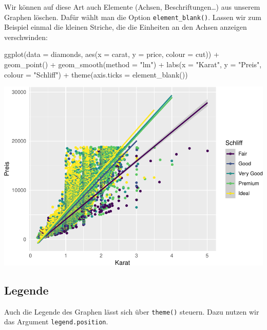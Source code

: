 \documentclass[
]{book}
\newenvironment{Shaded}{\begin{snugshade}}{\end{snugshade}}
\newcommand{\AttributeTok}[1]{\textcolor[rgb]{0.77,0.63,0.00}{#1}}
\newcommand{\FunctionTok}[1]{\textcolor[rgb]{0.00,0.00,0.00}{#1}}
\newcommand{\NormalTok}[1]{#1}
\newcommand{\SpecialCharTok}[1]{\textcolor[rgb]{0.00,0.00,0.00}{#1}}
\newcommand{\StringTok}[1]{\textcolor[rgb]{0.31,0.60,0.02}{#1}}
\begin{document}
Wir können auf diese Art auch Elemente (Achsen, Beschriftungen\ldots) aus unserem Graphen löschen. Dafür wählt man die Option \texttt{element\_blank()}. Lassen wir zum Beispiel einmal die kleinen Striche, die die Einheiten an den Achsen anzeigen verschwinden:

\begin{Shaded}
\begin{Highlighting}[]
\FunctionTok{ggplot}\NormalTok{(}\AttributeTok{data =}\NormalTok{ diamonds, }\FunctionTok{aes}\NormalTok{(}\AttributeTok{x =}\NormalTok{ carat, }\AttributeTok{y =}\NormalTok{ price, }\AttributeTok{colour =}\NormalTok{ cut)) }\SpecialCharTok{+}
  \FunctionTok{geom\_point}\NormalTok{() }\SpecialCharTok{+}
  \FunctionTok{geom\_smooth}\NormalTok{(}\AttributeTok{method =} \StringTok{"lm"}\NormalTok{) }\SpecialCharTok{+}
  \FunctionTok{labs}\NormalTok{(}\AttributeTok{x =} \StringTok{"Karat"}\NormalTok{, }\AttributeTok{y =} \StringTok{"Preis"}\NormalTok{, }\AttributeTok{colour =} \StringTok{"Schliff"}\NormalTok{) }\SpecialCharTok{+}
  \FunctionTok{theme}\NormalTok{(}\AttributeTok{axis.ticks =} \FunctionTok{element\_blank}\NormalTok{())}
\end{Highlighting}
\end{Shaded}

\includegraphics{CFH_R_bookdown_files/figure-latex/unnamed-chunk-179-1.pdf}

\hypertarget{legende}{%
\subsection{Legende}\label{legende}}

Auch die Legende des Graphen lässt sich über \texttt{theme()} steuern. Dazu nutzen wir das Argument \texttt{legend.position}.
\end{document}
